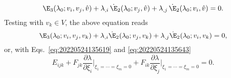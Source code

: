 

\begin{equation}
    \E_3(\lambda_0; v_i , v_j, \hat{v}) + \lambda_{,i} \, \dot{\E}_2(\lambda_0; v_j, \hat{v}) + \lambda_{,j} \, \dot{\E}_2(\lambda_0; v_i, \hat{v}) = 0.
\end{equation}
Testing with $v_k \in V$, the above equation reads
\begin{equation}
  \E_3(\lambda_0; v_i , v_j, v_k) + \lambda_{,i} \dot{\E}_2(\lambda_0; v_j, v_k) + \lambda_{,j} \dot{\E}_2(\lambda_0; v_i, v_k) = 0,
\end{equation}
or, with Eqs.~\eqref{eq:20220524135619} and \eqref{eq:20220524135643}
\begin{equation}
  \label{eq:20220902125031}
  E_{ijk} +  F_{jk} \frac{\partial\lambda}{\partial\xi_i} \biggr\rvert_{\xi_1 = \cdots = \xi_m = 0} + F_{ik} \frac{\partial\lambda}{\partial\xi_j} \biggr\rvert_{\xi_1 = \cdots = \xi_m = 0} = 0.
\end{equation}

